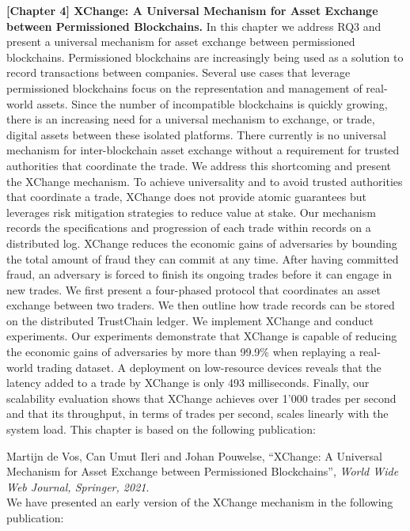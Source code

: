 \textbf{[Chapter 4] XChange: A Universal Mechanism for Asset Exchange between Permissioned Blockchains.}
In this chapter we address RQ3 and present a universal mechanism for asset exchange between permissioned blockchains.
Permissioned blockchains are increasingly being used as a solution to record transactions between companies.
Several use cases that leverage permissioned blockchains focus on the representation and management of real-world assets.
Since the number of incompatible blockchains is quickly growing, there is an increasing need for a universal mechanism to exchange, or trade, digital assets between these isolated platforms.
There currently is no universal mechanism for inter-blockchain asset exchange without a requirement for trusted authorities that coordinate the trade.
We address this shortcoming and present the XChange mechanism.
To achieve universality and to avoid trusted authorities that coordinate a trade, XChange does not provide atomic guarantees but leverages risk mitigation strategies to reduce value at stake.
Our mechanism records the specifications and progression of each trade within records on a distributed log.
XChange reduces the economic gains of adversaries by bounding the total amount of fraud they can commit at any time.
After having committed fraud, an adversary is forced to finish its ongoing trades before it can engage in new trades.
We first present a four-phased protocol that coordinates an asset exchange between two traders.
We then outline how trade records can be stored on the distributed TrustChain ledger.
We implement XChange and conduct experiments.
Our experiments demonstrate that XChange is capable of reducing the economic gains of adversaries by more than 99.9\% when replaying a real-world trading dataset.
A deployment on low-resource devices reveals that the latency added to a trade by XChange is only 493 milliseconds.
Finally, our scalability evaluation shows that XChange achieves over 1’000 trades per second and that its throughput, in terms of trades per second, scales linearly with the system load.
This chapter is based on the following publication:

Martijn de Vos, Can Umut Ileri and Johan Pouwelse, \enquote{XChange: A Universal Mechanism for Asset Exchange between Permissioned Blockchains}, \emph{World Wide Web Journal, Springer, 2021}.\\

\noindent We have presented an early version of the XChange mechanism in the following publication:\\

